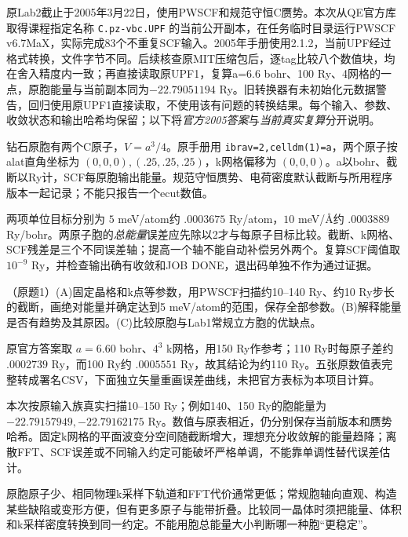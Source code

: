 原Lab2截止于2005年3月22日，使用PWSCF和规范守恒C赝势。本次从QE官方库取得课程指定名称 \texttt{C.pz-vbc.UPF} 的当前公开副本，在任务临时目录运行PWSCF v6.7MaX，实际完成83个不重复SCF输入。2005年手册使用2.1.2，当前UPF经过格式转换，文件字节不同。后续核查原MIT压缩包后，逐tag比较八个数值块，均在舍入精度内一致；再直接读取原UPF1，复算a=6.6 bohr、100 Ry、4网格的一点，原胞能量与当前副本同为$-22.79051194$ Ry。旧转换器有未初始化元数据警告，回归使用原UPF1直接读取，不使用该有问题的转换结果。每个输入、参数、收敛状态和输出哈希均保留；以下将\emph{官方2005答案}与\emph{当前真实复算}分开说明。

钻石原胞有两个C原子，$V=a^3/4$。原手册用 \texttt{ibrav=2,celldm(1)=a}，两个原子按alat直角坐标为 $(0,0,0),(.25,.25,.25)$，k网格偏移为 $(0,0,0)$。a以bohr、截断以Ry计，SCF每原胞输出能量。规范守恒赝势、电荷密度默认截断与所用程序版本一起记录；不能只报告一个ecut数值。

两项单位目标分别为 $5$ meV/atom约 $.0003675$ Ry/atom，$10$ meV/\AA{}约 $.0003889$ Ry/bohr。两原子胞的\emph{总能量}误差应先除以2才与每原子目标比较。截断、k网格、SCF残差是三个不同误差轴；提高一个轴不能自动补偿另外两个。复算SCF阈值取 $10^{-9}$ Ry，并检查输出确有收敛和JOB DONE，退出码单独不作为通过证据。

\begin{exercise}\label{task:lab2-1}
（原题1）(A)固定晶格和k点等参数，用PWSCF扫描约10--140 Ry、约10 Ry步长的截断，画绝对能量并确定达到5 meV/atom的范围，保存全部参数。(B)解释能量是否有趋势及其原因。(C)比较原胞与Lab1常规立方胞的优缺点。
\end{exercise}
\begin{solution}
原官方答案取 $a=6.60$ bohr、$4^3$ k网格，用150 Ry作参考；110 Ry时每原子差约 $.0002739$ Ry，而100 Ry约 $.0005551$ Ry，故其结论为约110 Ry。五张原数值表完整转成署名CSV，下面独立矢量重画误差曲线，未把官方表标为本项目计算。
\begin{center}\end{center}

本次按原输入族真实扫描10--150 Ry；例如140、150 Ry的胞能量为 $-22.79157949,-22.79162175$ Ry。数值与原表相近，仍分别保存当前版本和赝势哈希。固定k网格的平面波变分空间随截断增大，理想充分收敛解的能量趋降；离散FFT、SCF误差或不同输入约定可能破坏严格单调，不能靠单调性替代误差估计。

原胞原子少、相同物理k采样下轨道和FFT代价通常更低；常规胞轴向直观、构造某些缺陷或变形方便，但有更多原子与能带折叠。比较同一晶体时须把能量、体积和k采样密度转换到同一约定。不能用胞总能量大小判断哪一种胞“更稳定”。
\end{solution}

